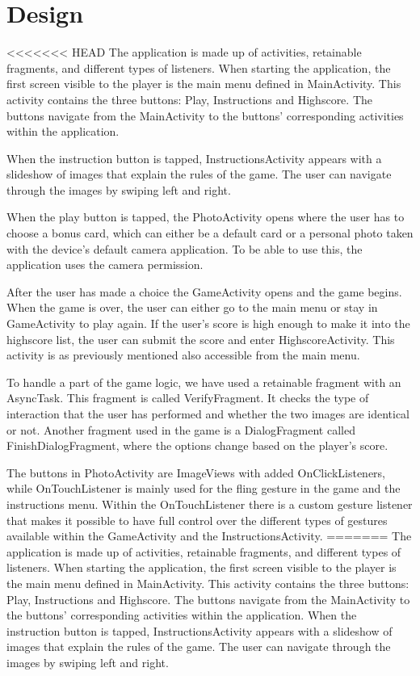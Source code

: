 \section{Design}
<<<<<<< HEAD
The application is made up of activities, retainable fragments, and different types of listeners. When starting the application, the first screen visible to the player is the main menu defined in MainActivity. This activity contains the three buttons: Play, Instructions and Highscore. The buttons navigate from the MainActivity to the buttons' corresponding activities within the application. 

When the instruction button is tapped, InstructionsActivity appears with a slideshow of images that explain the rules of the game. The user can navigate through the images by swiping left and right. \newline

When the play button is tapped, the PhotoActivity opens where the user has to choose a bonus card, which can either be a default card or a personal photo taken with the device’s default camera application. To be able to use this, the application uses the camera permission. \newline

After the user has made a choice the GameActivity opens and the game begins. When the game is over, the user can either go to the main menu or stay in GameActivity to play again. If the user’s score is high enough to make it into the highscore list, the user can submit the score and enter HighscoreActivity. This activity is as previously mentioned also accessible from the main menu. \newline

To handle a part of the game logic, we have used a retainable fragment with an AsyncTask. This fragment is called VerifyFragment. It checks the type of interaction that the user has performed and whether the two images are identical or not. Another fragment used in the game is a  DialogFragment called FinishDialogFragment, where the options change based on the player’s score. \newline

The buttons in PhotoActivity are ImageViews with added OnClickListeners, while OnTouchListener is mainly used for the fling gesture in the game and the instructions menu. Within the OnTouchListener there is a custom gesture listener that makes it possible to have full control over the different types of gestures available within the GameActivity and the InstructionsActivity.
=======
The application is made up of activities, retainable fragments, and different types of listeners. When starting the application, the first screen visible to the player is the main menu defined in MainActivity. This activity contains the three buttons: Play, Instructions and Highscore. The buttons navigate from the MainActivity to the buttons’ corresponding activities within the application. When the instruction button is tapped, InstructionsActivity appears with a slideshow of images that explain the rules of the game. The user can navigate through the images by swiping left and right.  \newline

